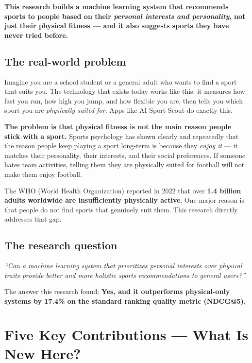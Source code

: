 \documentclass[12pt,a4paper]{article}
\begin{document}
\begin{keybox}
\textbf{This research builds a machine learning system that recommends
sports to people based on their \emph{personal interests and personality},
not just their physical fitness --- and it also suggests sports they have
never tried before.}
\end{keybox}

\subsection{The real-world problem}

Imagine you are a school student or a general adult who wants to find a sport
that suits you. The technology that exists today works like this: it measures
how fast you run, how high you jump, and how flexible you are, then tells you
which sport you are \emph{physically suited for}. Apps like AI Sport Scout do
exactly this.

\textbf{The problem is that physical fitness is not the main reason people
stick with a sport.} Sports psychology has shown clearly and repeatedly that
the reason people keep playing a sport long-term is because they \emph{enjoy
it} --- it matches their personality, their interests, and their social
preferences. If someone hates team activities, telling them they are
physically suited for football will not make them enjoy football.

The WHO (World Health Organization) reported in 2022 that over \textbf{1.4 billion
adults worldwide are insufficiently physically active}. One major reason is
that people do not find sports that genuinely suit them. This research
directly addresses that gap.

\subsection{The research question}

\begin{keybox}
\textit{``Can a machine learning system that prioritizes personal interests
over physical traits provide better and more holistic sports recommendations
to general users?''}
\end{keybox}

The answer this research found: \textbf{Yes, and it outperforms physical-only
systems by 17.4\% on the standard ranking quality metric (NDCG@5).}

\section{Five Key Contributions --- What Is New Here?}
\end{document}
